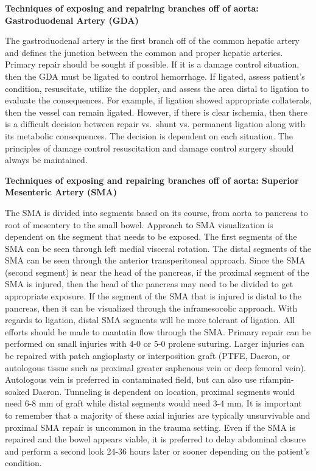 \documentclass[
]{book}
\begin{document}
\textbf{Techniques of exposing and repairing branches off of aorta:
Gastroduodenal Artery (GDA)}

The gastroduodenal artery is the first branch off of the common hepatic
artery and defines the junction between the common and proper hepatic
arteries. Primary repair should be sought if possible. If it is a damage
control situation, then the GDA must be ligated to control hemorrhage.
If ligated, assess patient's condition, resuscitate, utilize the
doppler, and assess the area distal to ligation to evaluate the
consequences. For example, if ligation showed appropriate collaterals,
then the vessel can remain ligated. However, if there is clear ischemia,
then there is a difficult decision between repair vs.~shunt vs.
permanent ligation along with its metabolic consequences. The decision
is dependent on each situation. The principles of damage control
resuscitation and damage control surgery should always be maintained.

\textbf{Techniques of exposing and repairing branches off of aorta: Superior
Mesenteric Artery (SMA)}

The SMA is divided into segments based on its course, from aorta to
pancreas to root of mesentery to the small bowel. Approach to SMA
visualization is dependent on the segment that needs to be exposed. The
first segments of the SMA can be seen through left medial visceral
rotation. The distal segments of the SMA can be seen through the
anterior transperitoneal approach. Since the SMA (second segment) is
near the head of the pancreas, if the proximal segment of the SMA is
injured, then the head of the pancreas may need to be divided to get
appropriate exposure. If the segment of the SMA that is injured is
distal to the pancreas, then it can be visualized through the
inframesocolic approach. With regards to ligation, distal SMA segments
will be more tolerant of ligation. All efforts should be made to
mantatin flow through the SMA. Primary repair can be performed on small
injuries with 4-0 or 5-0 prolene suturing. Larger injuries can be
repaired with patch angioplasty or interposition graft (PTFE, Dacron, or
autologous tissue such as proximal greater saphenous vein or deep
femoral vein). Autologous vein is preferred in contaminated field, but
can also use rifampin-soaked Dacron. Tunneling is dependent on location,
proximal segments would need 6-8 mm of graft while distal segments would
need 3-4 mm. It is important to remember that a majority of these axial
injuries are typically unsurvivable and proximal SMA repair is uncommon
in the trauma setting. Even if the SMA is repaired and the bowel appears
viable, it is preferred to delay abdominal closure and perform a second
look 24-36 hours later or sooner depending on the patient's condition.
\end{document}
